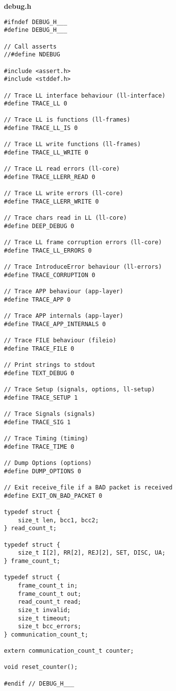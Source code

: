 \documentclass[subfiles]{main.tex}
\begin{document}
{\Large\textbf{debug.h}}

\begin{lstlisting}[style=rcom]
#ifndef DEBUG_H___
#define DEBUG_H___

// Call asserts
//#define NDEBUG

#include <assert.h>
#include <stddef.h>

// Trace LL interface behaviour (ll-interface)
#define TRACE_LL 0

// Trace LL is functions (ll-frames)
#define TRACE_LL_IS 0

// Trace LL write functions (ll-frames)
#define TRACE_LL_WRITE 0

// Trace LL read errors (ll-core)
#define TRACE_LLERR_READ 0

// Trace LL write errors (ll-core)
#define TRACE_LLERR_WRITE 0

// Trace chars read in LL (ll-core)
#define DEEP_DEBUG 0

// Trace LL frame corruption errors (ll-core)
#define TRACE_LL_ERRORS 0

// Trace IntroduceError behaviour (ll-errors)
#define TRACE_CORRUPTION 0

// Trace APP behaviour (app-layer)
#define TRACE_APP 0

// Trace APP internals (app-layer)
#define TRACE_APP_INTERNALS 0

// Trace FILE behaviour (fileio)
#define TRACE_FILE 0

// Print strings to stdout
#define TEXT_DEBUG 0

// Trace Setup (signals, options, ll-setup)
#define TRACE_SETUP 1

// Trace Signals (signals)
#define TRACE_SIG 1

// Trace Timing (timing)
#define TRACE_TIME 0

// Dump Options (options)
#define DUMP_OPTIONS 0

// Exit receive_file if a BAD packet is received
#define EXIT_ON_BAD_PACKET 0

typedef struct {
	size_t len, bcc1, bcc2;
} read_count_t;

typedef struct {
	size_t I[2], RR[2], REJ[2], SET, DISC, UA;
} frame_count_t;

typedef struct {
	frame_count_t in;
	frame_count_t out;
	read_count_t read;
	size_t invalid;
	size_t timeout;
	size_t bcc_errors;
} communication_count_t;

extern communication_count_t counter;

void reset_counter();

#endif // DEBUG_H___
\end{lstlisting}
\end{document}

